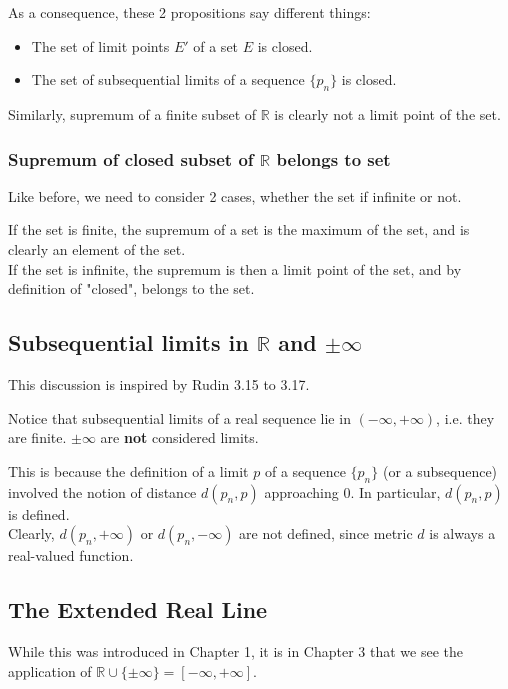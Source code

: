 \documentclass{article}
\begin{document}
As a consequence, these 2 propositions say different things:
\begin{itemize}
	\item The set of limit points $E'$ of a set $E$ is closed.
	\item The set of subsequential limits of a sequence $\{p_n\}$ is closed.
\end{itemize}


Similarly, supremum of a finite subset of $\mathbb{R}$ is clearly not a limit point of the set.

\subsubsection{Supremum of closed subset of $\mathbb{R}$ belongs to set}
Like before, we need to consider 2 cases, whether the set if infinite or not.

If the set is finite, the supremum of a set is the maximum of the set, and is clearly an element of the set.\\
If the set is infinite, the supremum is then a limit point of the set, and by definition of "closed", belongs to the set.


\subsection{Subsequential limits in $\mathbb{R}$ and $\pm \infty$}
This discussion is inspired by Rudin 3.15 to 3.17.

Notice that subsequential limits of a real sequence lie in $(-\infty, +\infty)$, i.e. they are finite. $\pm \infty$ are \textbf{not} considered limits.

This is because the definition of a limit $p$ of a sequence $\{p_n\}$ (or a subsequence) involved the notion of distance $d(p_n, p)$ approaching 0. In particular, $d(p_n, p)$ is defined.\\
Clearly, $d(p_n, +\infty)$ or $d(p_n, -\infty)$ are not defined, since metric $d$ is always a real-valued function.

\subsection{The Extended Real Line}
While this was introduced in Chapter 1, it is in Chapter 3 that we see the application of $\mathbb{R} \cup \{\pm \infty\} = [-\infty, +\infty]$.
\end{document}

